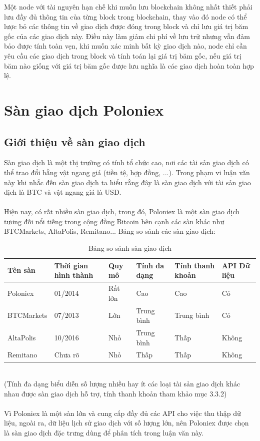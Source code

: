 Một node với tài nguyên hạn chế khi muốn lưu blockchain không nhất thiết phải 
lưu đầy đủ thông tin của từng block trong blockchain, thay vào đó node có thể 
lược bỏ các thông tin về giao dịch được đóng trong block và chỉ lưu giá trị băm 
gốc của các giao dịch này. Điều này làm giảm chi phí về lưu trữ nhưng vẫn đảm 
bảo được tính toàn vẹn, khi muốn xác minh bất kỳ giao dịch nào, node chỉ cần 
yêu cầu các giao dịch trong block và tính toán lại giá trị băm gốc, nếu giá trị 
băm nào giống với giá trị băm gốc được lưu nghĩa là các giao dịch hoàn toàn hợp 
lệ.
\section{Sàn giao dịch Poloniex}
\subsection{Giới thiệu về sàn giao dịch}
Sàn giao dịch là một thị trường có tính tổ chức cao, nơi các tài sản giao dịch 
có thể trao đổi bằng vật ngang giá (tiền tệ, hợp đồng, ...). Trong phạm vi luận 
văn này khi nhắc đến sàn giao dịch ta hiểu rằng đây là sàn giao dịch với tài 
sản giao dịch là BTC và vật ngang giá là USD.\\\\
Hiện nay, có rất nhiều sàn giao dịch, trong đó, Poloniex là một sàn giao dịch 
tương đối nổi tiếng trong cộng đồng Bitcoin bên cạnh các sàn khác như BTCMarkets, 
AltaPolis, Remitano...
Bảng so sánh các sàn giao dịch:
\begin{table}[h]
\centering
\begin{tabularx}{\textwidth}{ |l|X|X|X|X|X| }
\hline
Tên sàn & Thời gian hình thành & Quy mô & Tính đa dạng & Tính thanh khoản & API Dữ liệu \\
\hline
Poloniex & 01/2014 & Rất lớn & Cao & Cao & Có \\
\hline 
BTCMarkets & 07/2013 & Lớn & Trung bình & Trung bình & Có \\
\hline
AltaPolis & 10/2016 & Nhỏ & Trung bình & Thấp & Không \\
\hline
Remitano & Chưa rõ & Nhỏ & Thấp & Thấp & Không \\
\hline
\end{tabularx}
\caption{Bảng so sánh sàn giao dịch}
\end{table}\\
(Tính đa dạng biểu diễn số lượng nhiều hay ít các loại tài sản giao dịch khác 
nhau được sàn giao dịch hỗ trợ, tính thanh khoản tham khảo mục 3.3.2)\\\\
Vì Poloniex là một sàn lớn và cung cấp đầy đủ các API cho việc thu thập dữ liệu, 
ngoài ra, dữ liệu lịch sử giao dịch với số lượng lớn, nên Poloniex được chọn là sàn 
giao dịch đặc trưng dùng để phân tích trong luận văn này.
